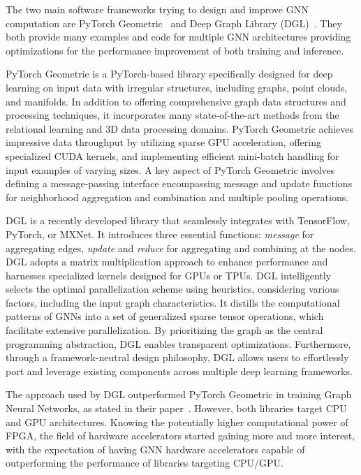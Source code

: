 The two main software frameworks trying to design and improve GNN computation are PyTorch Geometric~\cite{DBLP:journals/corr/abs-1903-02428} and Deep Graph Library (DGL)~\cite{DBLP:journals/corr/abs-1909-01315}.
They both provide many examples and code for multiple GNN architectures providing optimizations for the performance improvement of both training and inference.

PyTorch Geometric is a PyTorch-based library specifically designed for deep learning on input data with irregular structures, including graphs, point clouds, and manifolds.
In addition to offering comprehensive graph data structures and processing techniques, it incorporates many state-of-the-art methods from the relational learning and 3D data processing domains.
PyTorch Geometric achieves impressive data throughput by utilizing sparse GPU acceleration, offering specialized CUDA kernels, and implementing efficient mini-batch handling for input examples of varying sizes.
A key aspect of PyTorch Geometric involves defining a message-passing interface encompassing message and update functions for neighborhood aggregation and combination and multiple pooling operations.

DGL is a recently developed library that seamlessly integrates with TensorFlow, PyTorch, or MXNet.
It introduces three essential functions: \textit{message} for aggregating edges, \textit{update} and \textit{reduce} for aggregating and combining at the nodes.
DGL adopts a matrix multiplication approach to enhance performance and harnesses specialized kernels designed for GPUs or TPUs.
DGL intelligently selects the optimal parallelization scheme using heuristics, considering various factors, including the input graph characteristics.
It distills the computational patterns of GNNs into a set of generalized sparse tensor operations, which facilitate extensive parallelization.
By prioritizing the graph as the central programming abstraction, DGL enables transparent optimizations.
Furthermore, through a framework-neutral design philosophy, DGL allows users to effortlessly port and leverage existing components across multiple deep learning frameworks.

The approach used by DGL outperformed PyTorch Geometric in training Graph Neural Networks, as stated in their paper~\cite{DBLP:journals/corr/abs-1909-01315}.
However, both libraries target CPU and GPU architectures.
Knowing the potentially higher computational power of FPGA, the field of hardware accelerators started gaining more and more interest, with the expectation of having GNN hardware accelerators capable of outperforming the performance of libraries targeting CPU/GPU.

